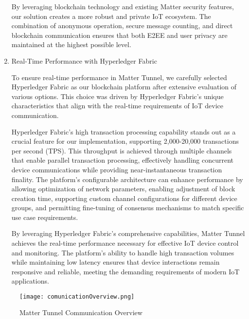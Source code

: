 \documentclass[conference]{IEEEtran}
\begin{document}
\begin{enumerate}[itemsep=2ex, parsep=1ex]
	      By leveraging blockchain technology and existing Matter security features,
	      our solution creates a more robust and private IoT ecosystem. The combination
	      of anonymous operation, secure message counting, and direct blockchain communication
	      ensures that both E2EE and user privacy are maintained at the highest possible
	      level.
	      	      	      
	\item Real-Time Performance with Hyperledger Fabric
	      	      	      
	      To ensure real-time performance in Matter Tunnel, we carefully selected Hyperledger
	      Fabric as our blockchain platform after extensive evaluation of various options.
	      This choice was driven by Hyperledger Fabric's unique characteristics that
	      align with the real-time requirements of IoT device communication.
	      	      	      
	      Hyperledger Fabric's high transaction processing capability stands out as
	      a crucial feature for our implementation, supporting 2,000-20,000 transactions
	      per second (TPS). This throughput is achieved through multiple channels
	      that enable parallel transaction processing, effectively handling concurrent
	      device communications while providing near-instantaneous transaction finality.
	      The platform's configurable architecture can enhance performance by
	      allowing optimization of network parameters, enabling adjustment of block creation
	      time, supporting custom channel configurations for different device groups,
	      and permitting fine-tuning of consensus mechanisms to match specific use case
	      requirements.
	      	      	      
	      By leveraging Hyperledger Fabric's comprehensive capabilities, Matter
	      Tunnel achieves the real-time performance necessary for effective IoT
	      device control and monitoring. The platform's ability to handle high transaction
	      volumes while maintaining low latency ensures that device interactions remain
	      responsive and reliable, meeting the demanding requirements of modern IoT
	      applications.
\end{enumerate}

\begin{figure}[h!]
	\centering
	\texttt{[image: comunicationOverview.png]}
	\caption{Matter Tunnel Communication Overview}
	\label{fig:MatterTunnelCommunicationOverview}
\end{figure}
\end{document}
